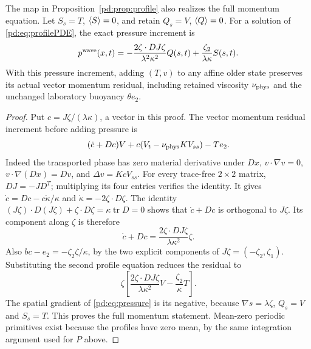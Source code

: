 \begin{pdproposition}\label{pd:prop:pressure}
The map in Proposition~\ref{pd:prop:profile} also realizes the full momentum
equation. Let $S_s=T$, $\langle S\rangle=0$, and retain $Q_s=V$, $\langle Q\rangle=0$.
For a solution of \eqref{pd:eq:profilePDE}, the exact pressure increment is
\begin{equation}\label{pd:eq:pressure}
 p^{\rm wave}(x,t)=
 -\frac{2\zeta\cdot D J\zeta}{\lambda^2\kappa^2}Q(s,t)
 +\frac{\zeta_2}{\lambda\kappa}S(s,t).
\end{equation}
With this pressure increment, adding $(T,v)$ to any affine older state
preserves its actual vector momentum residual, including retained
viscosity $\nu_{\rm phys}$ and the unchanged laboratory buoyancy $\theta e_2$.
\end{pdproposition}
\begin{proof}
Put $c=J\zeta/(\lambda\kappa)$, a vector in this proof. The vector
momentum residual increment before adding pressure is
\[
 (\dot c+Dc)V+c(V_t-\nu_{\rm phys} K V_{ss})-Te_2.
\]
Indeed the transported phase has zero material derivative under $Dx$,
$v\cdot\nabla v=0$, $v\cdot\nabla(Dx)=Dv$, and
$\Delta v=KcV_{ss}$.
For every trace-free $2\times2$ matrix,
$DJ=-JD^T$; multiplying its four entries verifies the identity.
It gives $\dot c=Dc-c\dot\kappa/\kappa$ and
$\dot\kappa=-2\zeta\cdot D\zeta$.
The identity
$(J\zeta)\cdot D(J\zeta)+\zeta\cdot D\zeta
=\kappa\operatorname{tr}D=0$ shows that $\dot c+Dc$ is orthogonal to
$J\zeta$. Its component along $\zeta$ is therefore
\[
 \dot c+Dc=\frac{2\zeta\cdot D J\zeta}{\lambda\kappa^2}\zeta.
\]
Also $bc-e_2=-\zeta_2\zeta/\kappa$, by the two explicit components of
$J\zeta=(-\zeta_2,\zeta_1)$. Substituting the second profile equation
reduces the residual to
\[
 \zeta\left[
 \frac{2\zeta\cdot D J\zeta}{\lambda\kappa^2}V
 -\frac{\zeta_2}{\kappa}T\right].
\]
The spatial gradient of \eqref{pd:eq:pressure} is its negative, because
$\nabla s=\lambda\zeta$, $Q_s=V$ and $S_s=T$.
This proves the full momentum statement. Mean-zero periodic primitives
exist because the profiles have zero mean, by the same integration
argument used for $P$ above.
\end{proof}

